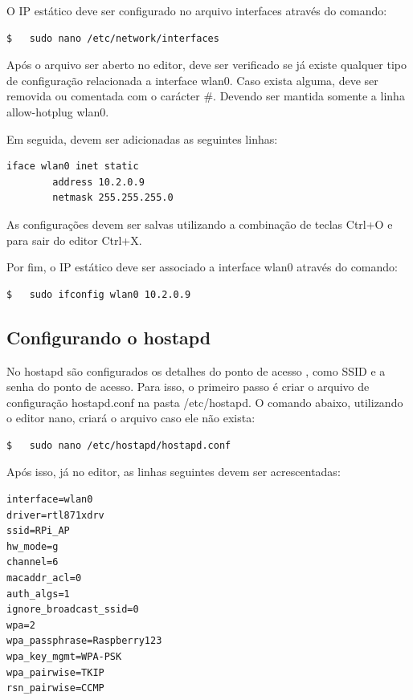 O IP estático deve ser configurado no arquivo interfaces através do comando: \\

\begin{lstlisting}[language=bash]
$   sudo nano /etc/network/interfaces
\end{lstlisting}

Após o arquivo ser aberto no editor, deve ser verificado se já existe qualquer tipo de configuração relacionada a interface wlan0. Caso exista alguma, deve ser removida ou comentada com o carácter \#. Devendo ser mantida somente a linha allow-hotplug wlan0.

Em seguida, devem ser adicionadas as seguintes linhas: \\

\begin{lstlisting}
iface wlan0 inet static
		address 10.2.0.9
		netmask 255.255.255.0 
\end{lstlisting}

As configurações devem ser salvas utilizando a combinação de teclas Ctrl+O e para sair do editor Ctrl+X.

Por fim, o IP estático deve ser associado a interface wlan0 através do comando: \\

\begin{lstlisting}[language=bash]
$   sudo ifconfig wlan0 10.2.0.9
\end{lstlisting}

\subsection{Configurando o hostapd}
\label{sec:configurando-hostapd}

No hostapd são configurados os detalhes do ponto de acesso , como SSID e a senha do ponto de acesso. Para isso, o primeiro passo é criar o arquivo de configuração hostapd.conf na pasta /etc/hostapd. O comando abaixo, utilizando o editor nano, criará o arquivo caso ele não exista: \\

\begin{lstlisting}[language=bash]
$   sudo nano /etc/hostapd/hostapd.conf
\end{lstlisting}

Após isso, já no editor, as linhas seguintes devem ser acrescentadas: \\

\begin{lstlisting}
interface=wlan0
driver=rtl871xdrv
ssid=RPi_AP
hw_mode=g
channel=6
macaddr_acl=0
auth_algs=1
ignore_broadcast_ssid=0
wpa=2
wpa_passphrase=Raspberry123
wpa_key_mgmt=WPA-PSK
wpa_pairwise=TKIP
rsn_pairwise=CCMP 
\end{lstlisting}

